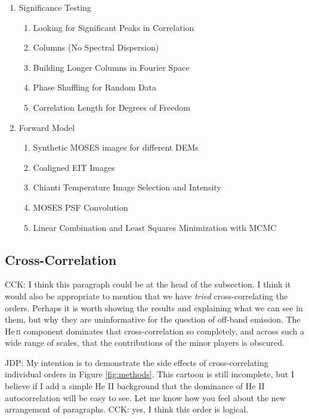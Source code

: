 \documentclass[]{solarphysics}
\newcommand{\cck}[1]{{\color{red} CCK: #1}} %
\newcommand{\jdp}[1]{{\color{blue} JDP: #1}} %
\begin{document}
\begin{article}
\begin{enumerate}
			\item Significance Testing
				\begin{enumerate}
					\item Looking for Significant Peaks in Correlation
					\item Columns (No Spectral Dispersion)
					\item Building Longer Columns in Fourier Space
					\item Phase Shuffling for Random Data
					\item Correlation Length for Degrees of Freedom
				\end{enumerate}
			
			\item Forward Model
				\begin{enumerate}
					\item Synthetic MOSES images for different DEMs
					\item Coaligned EIT Images
					\item Chianti Temperature Image Selection and Intensity
					\item MOSES PSF Convolution
					\item Linear Combination and Least Squares Minimization with MCMC
				\end{enumerate}
		\end{enumerate}
	

	
 		
 
 	
 	\subsection{Cross-Correlation}
 	\label{sec:crosscorrelation}
 	
 	 \cck{I think this paragraph could be at the head of the subsection. I think it would also be appropriate to mention that we have \emph{tried} cross-correlating the orders. Perhaps it is worth showing the results and explaining what we can see in them, but why they are uninformative for the question of off-band emission. The He\,\textsc{ii} component dominates that cross-correlation so completely, and across such a wide range of scales, that the contributions of the minor players is obscured.} 
 	 
 	 \jdp{My intention is to demonstrate the side effects of cross-correlating individual orders in Figure \ref{fig:methods}.  This cartoon is still incomplete, but I believe if I add a simple He II background that the dominance of He II autocorrelation will be easy to see.  Let me know how you feel about the new arrangement of paragraphs.}	\cck{yes, I think this order is logical.}
 	 

\end{article}
\end{document}
